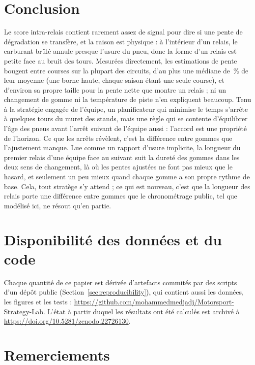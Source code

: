 \documentclass[11pt,a4paper]{article}
\begin{document}
\section{Conclusion}

Le score intra-relais contient rarement assez de signal pour dire si une pente
de dégradation se transfère, et la raison est physique : à l'intérieur d'un
relais, le carburant brûlé annule presque l'usure du pneu, donc la forme d'un
relais est petite face au bruit des tours. Mesurées directement, les estimations de pente bougent
entre courses sur la plupart des circuits, d'au plus une médiane de \TauPubShareReml{}\,\% de leur
moyenne (une borne haute, chaque saison étant une seule course), et d'environ sa propre taille pour la pente nette que montre un
relais ; ni un changement de gomme ni la température de piste n'en expliquent
beaucoup. Tenu à la stratégie engagée de l'équipe, un
planificateur qui minimise le temps s'arrête à quelques tours du muret des
stands, mais une règle qui se contente d'équilibrer l'âge des pneus avant
l'arrêt suivant de l'équipe aussi : l'accord est une propriété de l'horizon. Ce
que les arrêts révèlent, c'est la différence entre gommes que l'ajustement
manque. Lue comme un rapport d'usure implicite, la longueur du premier relais
d'une équipe face au suivant suit la dureté des gommes dans les deux sens de
changement, là où les pentes ajustées ne font pas mieux que le hasard, et
seulement un peu mieux quand chaque gomme a son propre rythme de base. Cela,
tout stratège s'y attend ; ce qui est nouveau, c'est que la longueur des relais
porte une différence entre gommes que le chronométrage public, tel que modélisé
ici, ne résout qu'en partie.

\section*{Disponibilité des données et du code}

Chaque quantité de ce papier est dérivée d'artefacts commités par des scripts
d'un dépôt public (Section~\ref{sec:reproducibility}), qui contient aussi les
données, les figures et les tests :
\url{https://github.com/mohammedmedjadj/Motorsport-Strategy-Lab}. L'état à partir
duquel les résultats ont été calculés est archivé à
\url{https://doi.org/10.5281/zenodo.22726130}.

\section*{Remerciements}
\end{document}
